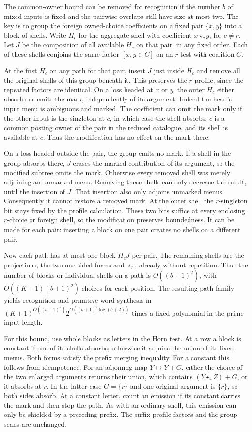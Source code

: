 The common-owner bound can be removed for recognition
if the number $b$ of mixed inputs is fixed and the
pairwise overlaps still have size at most two. The
key is to group the foreign owned-choice coefficients
on a fixed pair $\{x,y\}$ into a block of shells.
Write $H_c$ for the aggregate shell with coefficient
$x\star_c y$, for $c\ne r$. Let $J$ be the composition
of all available $H_c$ on that pair, in any fixed order.
Each of these shells conjoins the same factor
$[x,y\in C]$ on an $r$-test with coalition $C$.

At the first $H_c$ on any path for that pair, insert $J$
just inside $H_c$ and remove all the original shells of
this group beneath it. This preserves the $r$-profile,
since the repeated factors are identical. On a loss
headed at $x$ or $y$, the outer $H_c$ either absorbs
or emits the mark, independently of its argument. Indeed
the head's input menu is ambiguous and marked. The
coefficient can omit the mark only if the other input
is the singleton at $c$, in which case the shell
absorbs: $c$ is a common posting owner of the pair in
the reduced catalogue, and its shell is available at $c$.
Thus the modification has no effect on the mark there.

On a loss headed outside the pair, the group emits no
mark. If a shell in the group absorbs there, $J$ erases
the marked contribution of its argument, so the modified
subtree omits the mark. Otherwise every removed shell
was merely adjoining an unmarked menu. Removing these
shells can only decrease the result, until the insertion
of $J$. That insertion also only adjoins unmarked menus.
Consequently it cannot restore a removed mark. At the
outer shell the $r$-singleton bit stays fixed by the
profile calculation. These two bits suffice at every
enclosing $r$-choice or foreign shell, so the modification
preserves boundedness. It can be made for each pair:
inserting a block on one pair creates no shells on a
different pair.

Now each path has at most one block $H_c J$ per pair.
The remaining shells are the projections, the two
one-sided forms and $\star_r$, already without repetition.
Thus the number of blocks or individual shells on a path
is $O((b+1)^2)$, with $O((K+1)(b+1)^2)$ choices for each
position. The resulting path family yields recognition
and primitive-word synthesis in
$(K+1)^{O((b+1)^2)}2^{O((b+1)^2\log(b+2))}$
times a fixed polynomial in the prime input length.

For this bound, use whole blocks as letters in the Horn
test. At a row a block is constant if one of its shells
absorbs; otherwise it adjoins the union of its fixed
menus. Both forms satisfy the prefix merging inequality.
For a constant this follows from idempotence. For an
adjoining map $Y\mapsto Y+G$, either the choice of the
two enlarged arguments returns their union, which
contains $(Y\star_r Z)+G$, or it absorbs at $r$. In
the latter case $G=\{r\}$ and one original argument is
$\{r\}$, so both sides absorb. At a constant letter,
count an emission if its constant carries the mark and
then stop the path. As with an ordinary shell, this
emission can only be shielded by a preceding prefix.
The suffix profile factors and the group scans are
unchanged.

